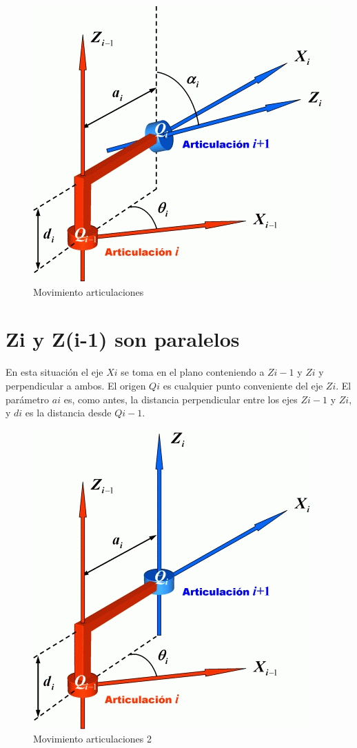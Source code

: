 \documentclass[11pt,a4paper,oldfontcommands,oneside]{memoir}
\begin{document}
\begin{figure}[h]
	\includegraphics[scale=.75]{2.png}
	\caption{Movimiento articulaciones}
	\label{2}
\end{figure}

\section{Zi y Z(i-1) son paralelos}
En esta situación el eje $Xi$ se toma en el plano conteniendo a $Zi-1$ y $Zi$ y perpendicular a ambos. El origen $Qi$ es cualquier punto conveniente del eje $Zi$.
El parámetro $ai$ es, como antes, la distancia perpendicular entre los ejes $Zi-1$ y $Zi$, y $di$ es la distancia desde $Qi-1$.

\begin{figure}[h]
	\includegraphics[scale=.75]{3.png}
	\caption{Movimiento articulaciones 2}
	\label{3}
\end{figure}
\end{document}
